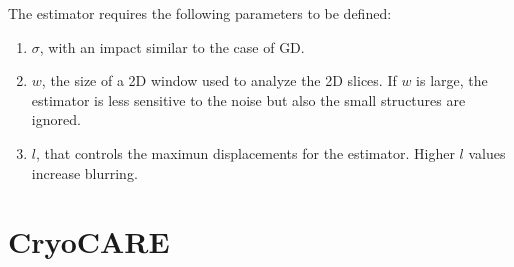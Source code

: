\documentclass{article}
\begin{document}
The estimator requires the following parameters to be defined:
\begin{enumerate}
\item $\sigma$, with an impact similar to the case of GD.
\item $w$, the size of a 2D window used to analyze the 2D slices. If
  $w$ is large, the estimator is less sensitive to the noise but also
  the small structures are ignored.
\item $l$, that controls the maximun displacements for the
  estimator. Higher $l$ values increase blurring.
\end{enumerate}
  
\section{CryoCARE}

\section{}



\end{document}
